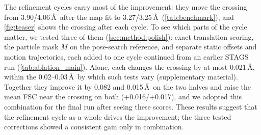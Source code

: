 The refinement cycles carry most of the improvement: they move the crossing from 3.90/4.06\,\AA\ after the map fit to 3.27/3.25\,\AA\ (\cref{tab:benchmark}), and \cref{fig:teaser} shows the crossing after each cycle.
To see which parts of the cycle matter, we tested three of them (\cref{sec:method:polish}): exact translation scoring, the particle mask $M$ on the pose-search reference, and separate static offsets and motion trajectories, each added to one cycle continued from an earlier STAGS run (\cref{tab:ablation_main}).
Alone, each changes the crossing by at most 0.021\,\AA, within the 0.02--0.03\,\AA\ by which such tests vary (supplementary material).%
Together they improve it by 0.082 and 0.015\,\AA\ on the two halves and raise the mean FSC near the crossing on both (+0.016/+0.017), and we adopted this combination for the final run after seeing these scores.
These results suggest that the refinement cycle as a whole drives the improvement; the three tested corrections showed a consistent gain only in combination.
